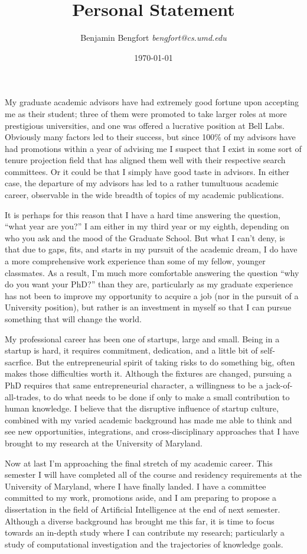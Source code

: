 \documentclass[11pt,letterpaper]{article}
\title{Personal Statement}
\author{Benjamin Bengfort \textit{bengfort@cs.umd.edu}}
\date{\today}
\begin{document}
\maketitle

My graduate academic advisors have had extremely good fortune upon accepting me as their student; three of them were promoted to take larger roles at more prestigious universities, and one was offered a lucrative position at Bell Labs. Obviously many factors led to their success, but since 100\% of my advisors have had promotions within a year of advising me I suspect that I exist in some sort of tenure projection field that has aligned them well with their respective search committees. Or it could be that I simply have good taste in advisors. In either case, the departure of my advisors has led to a rather tumultuous academic career, observable in the wide breadth of topics of my academic publications.

It is perhaps for this reason that I have a hard time answering the question, ``what year are you?'' I am either in my third year or my eighth, depending on who you ask and the mood of the Graduate School. But what I can't deny, is that due to gaps, fits, and starts in my pursuit of the academic dream, I do have a more comprehensive work experience than some of my fellow, younger classmates. As a result, I'm much more comfortable answering the question ``why do you want your PhD?'' than they are, particularly as my graduate experience has not been to improve my opportunity to acquire a job (nor in the pursuit of a University position), but rather is an investment in myself so that I can pursue something that will change the world.

My professional career has been one of startups, large and small. Being in a startup is hard, it requires commitment, dedication, and a little bit of self-sacrfice. But the entrepreneurial spirit of taking risks to do something big, often makes those difficulties worth it. Although the fixtures are changed, pursuing a PhD requires that same entrepreneurial character, a willingness to be a jack-of-all-trades, to do what needs to be done if only to make a small contribution to human knowledge. I believe that the disruptive influence of startup culture, combined with my varied academic background has made me able to think and see new opportunities, integrations, and cross-disciplinary approaches that I have brought to my research at the University of Maryland.

Now at last I'm approaching the final stretch of my academic career. This semester I will have completed all of the course and residency requirements at the University of Maryland, where I have finally landed. I have a committee committed to my work, promotions aside, and I am preparing to propose a dissertation in the field of Artificial Intelligence at the end of next semester. Although a diverse background has brought me this far, it is time to focus towards an in-depth study where I can contribute my research; particularly a study of computational investigation and the trajectories of knowledge goals.
\end{document}
